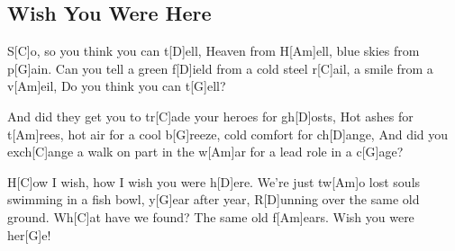 \subsection*{Wish You Were Here   }
\begin{guitar}
S[C]o, so you think you can t[D]ell,
Heaven from H[Am]ell, blue skies from p[G]ain.
Can you tell a green f[D]ield from a cold steel r[C]ail, a smile from a v[Am]eil,
Do you think you can t[G]ell?



And did they get you to tr[C]ade your heroes for gh[D]osts,
Hot ashes for t[Am]rees, hot air for a cool b[G]reeze, cold comfort for ch[D]ange,
And did you exch[C]ange a walk on part in the w[Am]ar for a lead role in a c[G]age?






H[C]ow I wish, how I wish you were h[D]ere.
We're just tw[Am]o lost souls swimming in a fish bowl, y[G]ear after year,
R[D]unning over the same old ground. Wh[C]at have we found?
The same old f[Am]ears. Wish you were her[G]e!



\end{guitar}
